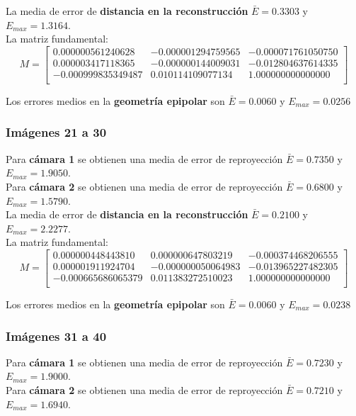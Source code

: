 \documentclass[a4paper, fontsize=11pt]{scrartcl} %
\numberwithin{equation}{section} %
\numberwithin{figure}{section} %
\numberwithin{table}{section} %
\begin{document}
	La media de error de \textbf{distancia en la reconstrucción} $\bar{E} = 0.3303$ y $E_{max} = 1.3164$.\\
	La matriz fundamental:
	\[
	M=
	\begin{bmatrix}
	0.000000561240628&	-0.000001294759565&	-0.000071761050750 \\
	0.000003417118365&	-0.000000144009031&	-0.012804637614335 \\
	-0.000999835349487&	0.010114109077134&	1.000000000000000  \\
	
	\end{bmatrix}
	\]
	
	Los errores medios en la \textbf{geometría epipolar} son $\bar{E} = 0.0060$ y $E_{max} = 0.0256$
	
	\subsubsection*{Imágenes 21 a 30}
	
	Para \textbf{cámara 1} se obtienen una media de error de reproyección $\bar{E} = 0.7350$ y $E_{max} = 1.9050$.\\
	Para \textbf{cámara 2} se obtienen una media de error de reproyección $\bar{E} = 0.6800$ y $E_{max} = 1.5790$.\\
	
	La media de error de \textbf{distancia en la reconstrucción} $\bar{E} = 0.2100$ y $E_{max} = 2.2277$.\\
	La matriz fundamental:
	\[
	M=
	\begin{bmatrix}
	0.000000448443810&	0.000000647803219&	-0.000374468206555 \\
	0.000001911924704&	-0.000000050064983&	-0.013965227482305 \\
	-0.000665686065379&	0.011383272510023&	1.000000000000000  \\
	
	\end{bmatrix}
	\]
	
	Los errores medios en la \textbf{geometría epipolar} son $\bar{E} = 0.0060$ y $E_{max} = 0.0238$
	
	\subsubsection*{Imágenes 31 a 40}
	
	Para \textbf{cámara 1} se obtienen una media de error de reproyección $\bar{E} = 0.7230$ y $E_{max} = 1.9000$.\\
	Para \textbf{cámara 2} se obtienen una media de error de reproyección $\bar{E} = 0.7210$ y $E_{max} = 1.6940$.\\
	
\end{document}
